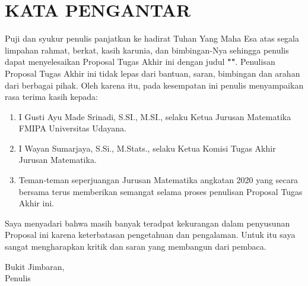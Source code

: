 \chapter*{\centering\small KATA PENGANTAR}

Puji dan syukur penulis panjatkan ke hadirat Tuhan Yang Maha Esa atas segala limpahan rahmat, berkat, kasih karunia, dan bimbingan-Nya sehingga penulis dapat menyelesaikan Proposal Tugas Akhir ini dengan judul \textbf{"\Judul"}. Penulisan Proposal Tugas Akhir ini tidak lepas dari bantuan, saran, bimbingan dan arahan dari berbagai pihak. Oleh karena itu, pada kesempatan ini penulis menyampaikan rasa terima kasih kepada:

\begin{enumerate}
  \item I Gusti Ayu Made Srinadi, S.SI., M.SI., selaku Ketua Jurusan Matematika FMIPA Universitas Udayana.
  \item I Wayan Sumarjaya, S.Si., M.Stats., selaku Ketua Komisi Tugas Akhir Jurusan Matematika.
  \item Teman-teman seperjuangan Jurusan Matematika angkatan 2020 yang secara bersama terus memberikan semangat selama proses penulisan Proposal Tugas Akhir ini.
\end{enumerate}

Saya menyadari bahwa masih banyak teradpat kekurangan dalam penyusunan Proposal ini karena keterbatasan pengetahuan dan pengalaman. Untuk itu saya sangat mengharapkan kritik dan saran yang membangun dari pembaca.

\begin{flushright}
  Bukit Jimbaran, \Tanggal\\
  \vspace{2cm}
  Penulis
\end{flushright}